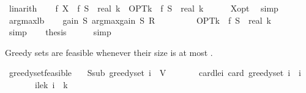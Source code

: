 \begin{isabellebody}
\ linarith\isanewline
\isanewline
\ \ \isamarkupfalse%
\ {\isachardoublequoteopen}{\isacharparenleft}{\kern0pt}f\ X\ {\isacharminus}{\kern0pt}\ f\ {\isacharquery}{\kern0pt}S{\isacharparenright}{\kern0pt}\ {\isacharslash}{\kern0pt}\ real\ k\ {\isacharequal}{\kern0pt}\ {\isacharparenleft}{\kern0pt}OPT{\isacharunderscore}{\kern0pt}k\ {\isacharminus}{\kern0pt}\ f\ {\isacharquery}{\kern0pt}S{\isacharparenright}{\kern0pt}\ {\isacharslash}{\kern0pt}\ real\ k{\isachardoublequoteclose}\isanewline
\ \ \ \ \isamarkupfalse%
\ X{\isacharunderscore}{\kern0pt}opt\ \isamarkupfalse%
\ simp\isanewline
\isanewline
\ \ \isamarkupfalse%
\ argmax{\isacharunderscore}{\kern0pt}lb\isanewline
\ \ \isamarkupfalse%
\ {\isachardoublequoteopen}gain\ {\isacharquery}{\kern0pt}S\ {\isacharparenleft}{\kern0pt}argmax{\isacharunderscore}{\kern0pt}gain\ {\isacharquery}{\kern0pt}S\ {\isacharquery}{\kern0pt}R{\isacharparenright}{\kern0pt}\isanewline
\ \ \ \ \ \ \ \ {\isasymge}\ {\isacharparenleft}{\kern0pt}OPT{\isacharunderscore}{\kern0pt}k\ {\isacharminus}{\kern0pt}\ f\ {\isacharquery}{\kern0pt}S{\isacharparenright}{\kern0pt}\ {\isacharslash}{\kern0pt}\ real\ k{\isachardoublequoteclose}\isanewline
\ \ \ \ \isamarkupfalse%
\ simp\isanewline
\isanewline
\ \ \isamarkupfalse%
\ {\isacharquery}{\kern0pt}thesis\isanewline
\ \ \ \ \isamarkupfalse%
\ simp\isanewline
{}\isamarkupfalse%
%
\endisatagproof
{\isafoldproof}%
%
\isadelimproof
%
\endisadelimproof
%
\begin{isamarkuptext}%
Greedy sets are feasible whenever their size is at most .%
\end{isamarkuptext}\isamarkuptrue%
\isamarkupfalse%
\ greedy{\isacharunderscore}{\kern0pt}set{\isacharunderscore}{\kern0pt}feasible{\isacharcolon}{\kern0pt}\isanewline
\ \ \ S{\isacharunderscore}{\kern0pt}sub{\isacharcolon}{\kern0pt}\ {\isachardoublequoteopen}greedy{\isacharunderscore}{\kern0pt}set\ i\ {\isasymsubseteq}\ V{\isachardoublequoteclose}\isanewline
\ \ \ \ \ \ \ card{\isacharunderscore}{\kern0pt}le{\isacharunderscore}{\kern0pt}i{\isacharcolon}{\kern0pt}\ {\isachardoublequoteopen}card\ {\isacharparenleft}{\kern0pt}greedy{\isacharunderscore}{\kern0pt}set\ i{\isacharparenright}{\kern0pt}\ {\isasymle}\ i{\isachardoublequoteclose}\isanewline
\ \ \ \ \ \ \ i{\isacharunderscore}{\kern0pt}le{\isacharunderscore}{\kern0pt}k{\isacharcolon}{\kern0pt}\ {\isachardoublequoteopen}i\ {\isasymle}\ k{\isachardoublequoteclose}\isanewline

\end{isabellebody}
